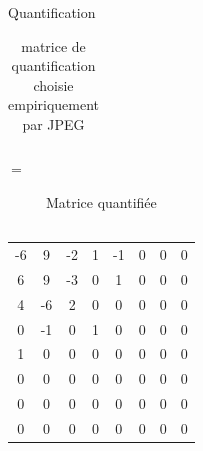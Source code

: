 \documentclass[xcolor=dvipsnames]{beamer}
\begin{document}
\begin{frame}{Quantification}
\begin{minipage}{0.3\textwidth}
\begin{table}
\begin{tabular}{cccccccc}
            \end{tabular}
            \caption*{\centering \tiny matrice de quantification choisie empiriquement par JPEG}
        \end{table}
    \end{minipage}
    \hfill
    \begin{minipage}{0.03\textwidth}
        \centering
        \Large
        \vspace{-40pt}
        $ \ \textbf{=} $
    \end{minipage}
    \hfill
    \begin{minipage}{0.23\textwidth}
        \centering
        \begin{table}
            \tiny 
            \centering
            \setlength{\tabcolsep}{2pt} %
            \renewcommand{\arraystretch}{1.2} %
            \begin{tabular}{cccccccc}
                -6 & 9 & -2 & 1 & -1 & 0 & 0 & 0 \\
                6 & 9 & -3 & 0 & 1 & 0 & 0 & 0 \\
                4 & -6 & 2 & 0 & 0 & 0 & 0 & 0 \\
                0 & -1 & 0 & 1 & 0 & 0 & 0 & 0 \\
                1 & 0 & 0 & 0 & 0 & 0 & 0 & 0 \\
                0 & 0 & 0 & 0 & 0 & 0 & 0 & 0 \\
                0 & 0 & 0 & 0 & 0 & 0 & 0 & 0 \\
                0 & 0 & 0 & 0 & 0 & 0 & 0 & 0 \\
            \end{tabular}
            \caption*{\centering \tiny Matrice quantifiée \\ \ }
        \end{table}
    \end{minipage}

\end{frame}
\end{document}
